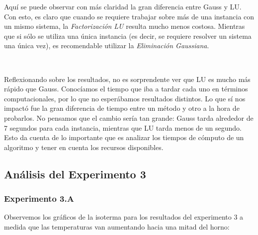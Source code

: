 Aquí se puede observar con más claridad la gran diferencia entre Gauss y LU. Con esto, es claro que cuando se requiere trabajar sobre más de una instancia con un mismo sistema, la \emph{Factorización LU} resulta mucho menos costosa. Mientras que si sólo se utiliza una única instancia (es decir, se requiere resolver un sistema una única vez), es recomendable utilizar la \emph{Eliminación Gaussiana}.

\

Reflexionando sobre los resultados, no es sorprendente ver que LU es mucho más rápido que Gauss. Conocíamos el tiempo que iba a tardar cada uno en términos computacionales, por lo que no esperábamos resultados distintos. Lo que sí nos impactó fue la gran diferencia de tiempo entre un método y otro a la hora de probarlos. No pensamos que el cambio sería tan grande: Gauss tarda alrededor de 7 segundos para cada instancia, mientras que LU tarda menos de un segundo. Esto da cuenta de lo importante que es analizar los tiempos de cómputo de un algoritmo y tener en cuenta los recursos disponibles.  

\subsection{Análisis del Experimento 3}

\subsubsection{Experimento 3.A}

Observemos los gráficos de la isoterma para los resultados del experimento 3 a medida que las temperaturas van aumentando hacia una mitad del horno:

